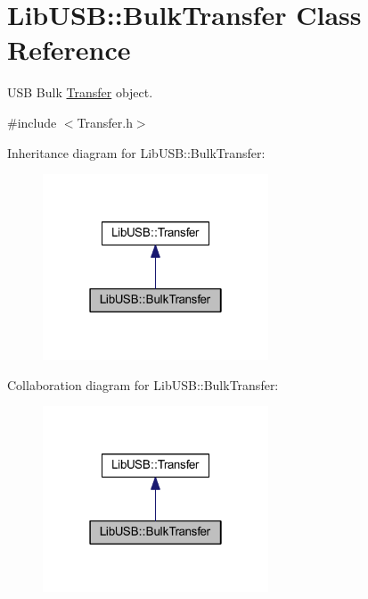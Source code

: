 \hypertarget{class_lib_u_s_b_1_1_bulk_transfer}{\section{Lib\-U\-S\-B\-:\-:Bulk\-Transfer Class Reference}
\label{class_lib_u_s_b_1_1_bulk_transfer}
}


U\-S\-B Bulk \hyperlink{class_lib_u_s_b_1_1_transfer}{Transfer} object.  




{\ttfamily \#include $<$Transfer.\-h$>$}



Inheritance diagram for Lib\-U\-S\-B\-:\-:Bulk\-Transfer\-:\nopagebreak
\begin{figure}[H]
\begin{center}
\leavevmode
\includegraphics[width=190pt]{class_lib_u_s_b_1_1_bulk_transfer__inherit__graph}
\end{center}
\end{figure}


Collaboration diagram for Lib\-U\-S\-B\-:\-:Bulk\-Transfer\-:\nopagebreak
\begin{figure}[H]
\begin{center}
\leavevmode
\includegraphics[width=190pt]{class_lib_u_s_b_1_1_bulk_transfer__coll__graph}
\end{center}
\end{figure}
